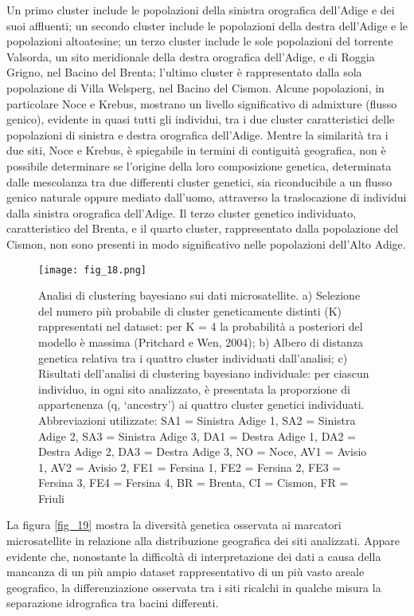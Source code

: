 \documentclass[11pt,a4paper,italian,twoside,openany]{memoir}
\begin{document}
Un primo cluster include le popolazioni della sinistra orografica dell'Adige e dei suoi affluenti; un secondo cluster include le popolazioni della destra dell'Adige e le popolazioni altoatesine; un terzo cluster include le sole popolazioni del torrente Valsorda, un sito meridionale della destra orografica dell'Adige, e di Roggia Grigno, nel Bacino del Brenta; l'ultimo cluster è rappresentato dalla sola popolazione di Villa Welsperg, nel Bacino del Cismon. Alcune popolazioni, in particolare Noce e Krebus, mostrano un livello significativo di admixture (flusso genico), evidente in quasi tutti gli individui, tra i due cluster caratteristici delle popolazioni di sinistra e destra orografica dell'Adige. Mentre la similarità tra i due siti, Noce e Krebus, è spiegabile in termini di contiguità geografica, non è possibile determinare se l'origine della loro composizione genetica, determinata dalle mescolanza tra due differenti cluster genetici, sia riconducibile a un flusso genico naturale oppure mediato dall'uomo, attraverso la traslocazione di individui dalla sinistra orografica dell'Adige. Il terzo cluster genetico individuato, caratteristico del Brenta, e il quarto cluster, rappresentato dalla popolazione del Cismon, non sono presenti in modo significativo nelle popolazioni dell'Alto Adige.
\newpage
\begin{figure}[H]
  \centering
  \texttt{[image: fig\_18.png]}
  \caption{Analisi di clustering bayesiano sui dati microsatellite. a) Selezione del numero più probabile di cluster geneticamente distinti (K) rappresentati nel dataset: per K = 4 la probabilità a posteriori del modello è massima (Pritchard e Wen, 2004); b) Albero di distanza genetica relativa tra i quattro cluster individuati dall'analisi; c) Risultati dell'analisi di clustering bayesiano individuale: per ciascun individuo, in ogni sito analizzato, è presentata la proporzione di appartenenza (q, ‘ancestry') ai quattro cluster genetici individuati. Abbreviazioni utilizzate: SA1 = Sinistra Adige 1, SA2 = Sinistra Adige 2, SA3 = Sinistra Adige 3, DA1 = Destra Adige 1, DA2 = Destra Adige 2, DA3 = Destra Adige 3, NO = Noce, AV1 = Avisio 1, AV2 = Avisio 2, FE1 = Fersina 1, FE2 = Fersina 2, FE3 = Fersina 3, FE4 = Fersina 4, BR = Brenta, CI = Cismon, FR = Friuli}
  \label{fig_18}
\end{figure}


La figura \ref{fig_19} mostra la diversità genetica osservata ai marcatori microsatellite in relazione alla distribuzione geografica dei siti analizzati. Appare evidente che, nonostante la difficoltà di interpretazione dei dati a causa della mancanza di un più ampio dataset rappresentativo di un più vasto areale geografico, la differenziazione osservata tra i siti ricalchi in qualche misura la separazione idrografica tra bacini differenti.
\end{document}
